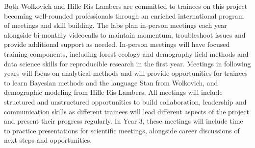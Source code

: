 \documentclass[12pt,oneside]{article}
\begin{document}
Both Wolkovich and Hille Ris Lambers are committed to trainees on this project becoming well-rounded professionals through an enriched international program of meetings and skill building. The labs plan in-person meetings each year  alongside bi-monthly videocalls to maintain momentum, troubleshoot issues and provide additional support as needed. In-person meetings will have focused training components, including forest ecology and demography field methods and data science skills for reproducible research in the first year. Meetings in following years will focus on analytical methods and will provide  opportunities for trainees to learn Bayesian methods and the language Stan from Wolkovich, and demographic modeling from Hille Ris Lambers. All meetings will include structured and unstructured opportunities to build collaboration, leadership and communication skills as different trainees will lead different aspects of the project and present their progress regularly. In Year 3, these meetings will include time to practice presentations for scientific meetings, alongside career discussions of next steps and opportunities.  %
\end{document}

